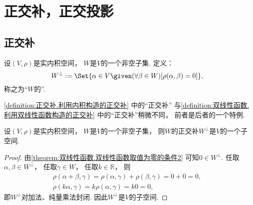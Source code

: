 \section{正交补，正交投影}
\subsection{正交补}
\begin{definition}\label{definition:正交补.利用内积构造的正交补}
设\((V,\rho)\)是实内积空间，
\(W\)是\(V\)的一个非空子集.
定义：\begin{equation*}
	W^\perp
	\defeq
	\Set{
		\alpha \in V
		\given
		(\forall \beta \in W)
		[\rho(\alpha,\beta) = 0]
	},
\end{equation*}
称之为“\(W\)的”.
\end{definition}
\begin{remark}
\cref{definition:正交补.利用内积构造的正交补} 中的“正交补”
与\cref{definition:双线性函数.利用双线性函数构造的正交补} 中的“正交补”稍微不同，
前者是后者的一个特例.
\end{remark}

\begin{property}
设\((V,\rho)\)是实内积空间，
\(W\)是\(V\)的一个非空子集，
则\(W\)的正交补\(W^\perp\)是\(V\)的一个子空间.
\begin{proof}
由\cref{theorem:双线性函数.双线性函数取值为零的条件2} 可知\(0 \in W^\perp\).
任取\(\alpha,\beta \in W^\perp\)，
任取\(\gamma \in W\)，
任取\(k \in \mathbb{R}\)，
则\begin{gather*}
	\rho(\alpha+\beta,\gamma)
	= \rho(\alpha,\gamma) + \rho(\beta,\gamma)
	= 0 + 0 = 0, \\
	\rho(k\alpha,\gamma)
	= k\rho(\alpha,\gamma)
	= k0 = 0,
\end{gather*}
即\(W^\perp\)对加法、纯量乘法封闭.
因此\(W^\perp\)是\(V\)的子空间.
\end{proof}
\end{property}

